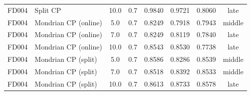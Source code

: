 \begin{table}[t]
\begin{tabular}{llcccccc}
FD004 & Split CP & 10.0 & 0.7 & 0.9840 & 0.9721 & 0.8060 & late \\
FD004 & Mondrian CP (online) & 5.0 & 0.7 & 0.8249 & 0.7918 & 0.7943 & middle \\
FD004 & Mondrian CP (online) & 7.0 & 0.7 & 0.8249 & 0.8119 & 0.7840 & late \\
FD004 & Mondrian CP (online) & 10.0 & 0.7 & 0.8543 & 0.8530 & 0.7738 & late \\
FD004 & Mondrian CP (split) & 5.0 & 0.7 & 0.8586 & 0.8286 & 0.8539 & middle \\
FD004 & Mondrian CP (split) & 7.0 & 0.7 & 0.8518 & 0.8392 & 0.8533 & middle \\
FD004 & Mondrian CP (split) & 10.0 & 0.7 & 0.8613 & 0.8733 & 0.8578 & late \\
\bottomrule
\end{tabular}
\end{table}
